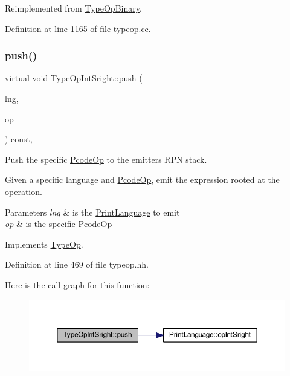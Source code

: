 Reimplemented from \mbox{\hyperlink{class_type_op_binary_a3f26fc1e6bc1d143fb4f8391ef7ff3d6}{Type\+Op\+Binary}}.



Definition at line 1165 of file typeop.\+cc.

\mbox{\label{class_type_op_int_sright_afb421e7659a24ce65a7680a1ac4e8592}} 
\subsubsection{\texorpdfstring{push()}{push()}}
{\footnotesize\ttfamily virtual void Type\+Op\+Int\+Sright\+::push (\begin{DoxyParamCaption}\item[{\mbox{\hyperlink{class_print_language}{Print\+Language}} $\ast$}]{lng,  }\item[{const \mbox{\hyperlink{class_pcode_op}{Pcode\+Op}} $\ast$}]{op }\end{DoxyParamCaption}) const\hspace{0.3cm}{\ttfamily [inline]}, {\ttfamily [virtual]}}



Push the specific \mbox{\hyperlink{class_pcode_op}{Pcode\+Op}} to the emitter\textquotesingle{}s R\+PN stack. 

Given a specific language and \mbox{\hyperlink{class_pcode_op}{Pcode\+Op}}, emit the expression rooted at the operation. 
\begin{DoxyParams}{Parameters}
{\em lng} & is the \mbox{\hyperlink{class_print_language}{Print\+Language}} to emit \\
\hline
{\em op} & is the specific \mbox{\hyperlink{class_pcode_op}{Pcode\+Op}} \\
\hline
\end{DoxyParams}


Implements \mbox{\hyperlink{class_type_op_ac9c9544203ed74dabe6ac662b653b2af}{Type\+Op}}.



Definition at line 469 of file typeop.\+hh.

Here is the call graph for this function\+:
\nopagebreak
\begin{figure}[H]
\begin{center}
\leavevmode
\includegraphics[width=350pt]{class_type_op_int_sright_afb421e7659a24ce65a7680a1ac4e8592_cgraph}
\end{center}
\end{figure}


